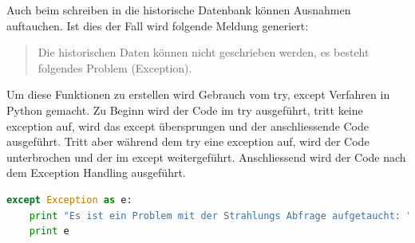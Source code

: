 Auch beim schreiben in die historische Datenbank können Ausnahmen auftauchen. Ist dies der Fall wird folgende Meldung generiert:\\
\begin{quote}
Die historischen Daten können nicht geschrieben werden, es besteht folgendes Problem (Exception).
\end{quote}

Um diese Funktionen zu erstellen wird Gebrauch vom try, except Verfahren in Python gemacht. Zu Beginn wird der Code im try ausgeführt, tritt keine exception auf, wird das except übersprungen und der anschliessende Code ausgeführt. Tritt aber während dem try eine exception auf, wird der Code unterbrochen und der im except weitergeführt. Anschliessend wird der Code nach dem Exception Handling ausgeführt.\cite{ThePythonTutorial8.ErrorsAndExceptions:Python}

\begin{lstlisting}[label=lst:printfunction,caption=Beispiel für print Funktion, language=Python, style=py]
except Exception as e:
    print "Es ist ein Problem mit der Strahlungs Abfrage aufgetaucht: "
    print e
\end{lstlisting}
